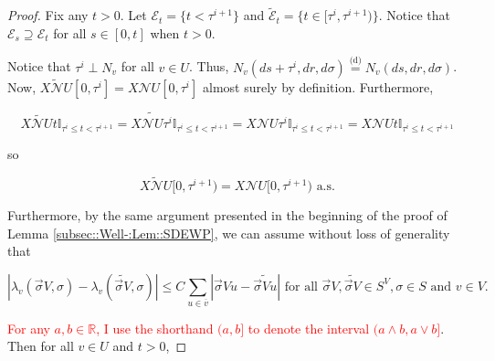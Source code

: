 \documentclass[12pt]{article}
\newcommand{\mb}{\mathbb}
\newcommand{\mc}{\mathcal}
\newcommand{\ov}{\overline}
\newcommand{\te}{\text}
\newcommand{\tr}{\textcolor{red}}
\newcommand{\ind}{\hspace{24pt}}
\newcommand{\deq}{\overset{\text{(d)}}{=}}			%
\newcommand{\neigh}{\mc{N}}					%
\renewcommand{\v}{v}							%
\newcommand{\vv}{u}								%
\renewcommand{\U}{U}							%
\renewcommand{\S}{S}							%
\newcommand{\s}{\sigma}							%
\newcommand{\sv}{\vec{\s}}						%
\renewcommand{\t}{t}							%
\renewcommand{\tt}{s}							%
\newcommand{\X}{X}								%
\newcommand{\cl}{\ov}							%
\newcommand{\poiss}[1]{N_{#1}}						%
\newcommand{\V}{V}									%
\newcommand{\rt}[1]{\tau^{#1}}						%
\newcommand{\itt}{i}								%
\newcommand{\XState}[1]{\S^{#1}}				%
\newcommand{\rate}[1]{\lambda_{#1}}					%
\newcommand{\const}[1]{C_{#1}}						%
\newcommand{\alt}{\widetilde}						%
\newcommand{\evnt}{\mc{E}}						%
\begin{document}
\begin{proof}
\ind Fix any \(\t > 0\). Let \(\evnt_\t = \{\t < \rt{\itt+1}\}\) and \(\alt{\evnt}_\t = \{\t\in [\rt{\itt},\rt{\itt+1})\}\). Notice that \(\evnt_\tt \supseteq \evnt_\t\) for all \(\tt\in [0,\t]\) when \(\t > 0\). 

\ind Notice that \(\rt{\itt} \perp \poiss{\v}\) for all \(\v \in \U\). Thus, \(\poiss{\v}(d\tt+\rt{\itt},dr,d\s) \deq \poiss{\v}(d\tt,dr,d\s)\). Now, \(\alt{\X{\neigh{\U}}{}}[0,\rt{\itt}] = \X{\neigh{\U}}{[0,\rt{\itt}]}\) almost surely by definition. Furthermore,

\[\alt{\X{\neigh{\U}}{\t}}\mb{I}_{\rt{\itt}\leq \t < \rt{\itt+1}} = \alt{\X{\neigh{\U}}{\rt{\itt}}}\mb{I}_{\rt{\itt}\leq \t < \rt{\itt+1}} = \X{\neigh{\U}}{\rt{\itt}}\mb{I}_{\rt{\itt}\leq \t < \rt{\itt+1}} = \X{\neigh{\U}}{\t}\mb{I}_{\rt{\itt}\leq \t < \rt{\itt+1}}\]

so

\[\alt{\X{\neigh{\U}}{}}[0,\rt{\itt+1}) = \X{\neigh{\U}}{[0,\rt{\itt+1})} \te{ a.s.}\]

Furthermore, by the same argument presented in the beginning of the proof of Lemma \ref{subsec::Well-:Lem::SDEWP}, we can assume without loss of generality that 

\[|\rate{\v}(\sv{\V}{},\s) - \rate{\v}(\alt{\sv{\V}{}},\s)| \leq \const{}\sum_{\vv\in \cl{\v}} |\sv{\V}{\vv} - \alt{\sv{\V}{\vv}}|\te{ for all } \sv{\V}{},\alt{\sv{\V}{}}\in \S^\V,\s \in \S \te{ and } \v \in \V.\]

\tr{For any \(a,b\in \mb{R}\), I use the shorthand \((a,b]\) to denote the interval \((a\wedge b,a\vee b]\)}. Then for all \(v\in \U\) and \(\t > 0\),


\end{proof}
\end{document}
